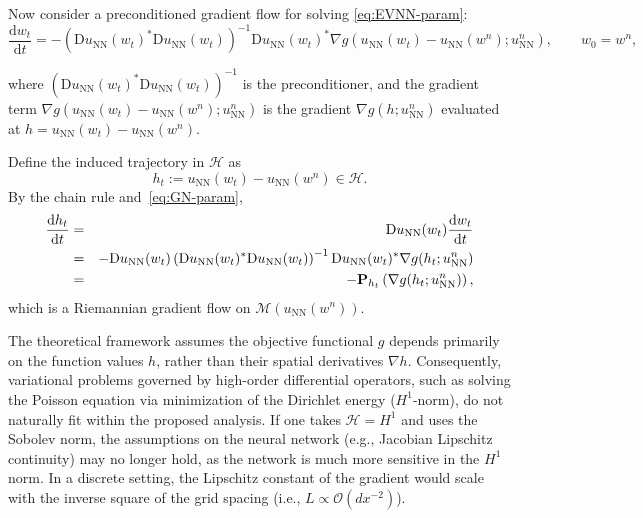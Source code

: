 \documentclass[twoside,11pt]{article}
\renewcommand{\P}{\mathbf{P}}
\newcommand{\D}{\mathrm{D}}
\newcommand{\NN}{\mathrm{NN}}
\begin{document}
Now consider a preconditioned gradient flow for solving \eqref{eq:EVNN-param}:
\begin{equation}\label{eq:GN-param}
\frac{\mathrm d w_t}{\mathrm dt}
   =- \left(\D u_\NN(w_t)^*\D u_\NN(w_t) \right)^{-1} \D u_\NN(w_t)^* \nabla g( u_\NN(w_t) - u_\NN(w^n);u_\NN^n),
   \qquad w_0=w^n,
\end{equation}

where $\left(\D u_\NN(w_t)^*\D u_\NN(w_t) \right)^{-1}$ is the preconditioner, and the gradient term $\nabla g( u_\NN(w_t) - u_\NN(w^n);u_\NN^n)$ is the gradient $\nabla g(h; u_\NN^n)$ evaluated at $h = u_\NN(w_t) - u_\NN(w^n)$.

Define the induced trajectory in $\mathcal{H}$ as
\[
h_t:= u_\NN(w_t) - u_\NN(w^n) \in\mathcal H.
\]
By the chain rule and~\eqref{eq:GN-param},
\begin{eqnarray}
\frac{\mathrm d h_t}{\mathrm dt}
 \notag &=& \D u_\NN(w_t)\frac{\mathrm d w_t}{\mathrm dt}
 \\
 \notag &=&-\D u_\NN(w_t) \left(\D u_\NN (w_t)^*\D u_\NN (w_t) \right)^{-1} \D u_\NN (w_t)^* \nabla g(h_t;u_\NN^n)\\ 
 &=& - \P_{h_t} \left( \nabla g(h_t;u_\NN^n) \right), \notag
\end{eqnarray}
which is a Riemannian gradient flow on $\mathcal{M}(u_\NN(w^n))$. 


\begin{remark}
The theoretical framework assumes the objective functional $g$ depends primarily on the function values $h$, rather than their spatial derivatives $\nabla h$. Consequently, variational problems governed by high-order differential operators, such as solving the Poisson equation via minimization of the Dirichlet energy ($H^1$-norm), do not naturally fit within the proposed analysis. If one takes $\mathcal{H} = H^1$ and uses the Sobolev norm, the assumptions on the neural network (e.g., Jacobian Lipschitz continuity) may no longer hold, as the network is much more sensitive in the $H^1$ norm. In a discrete setting, the Lipschitz constant of the gradient would scale with the inverse square of the grid spacing (i.e., $L \propto \mathcal{O}(dx^{-2})$).
\end{remark}
\end{document}
